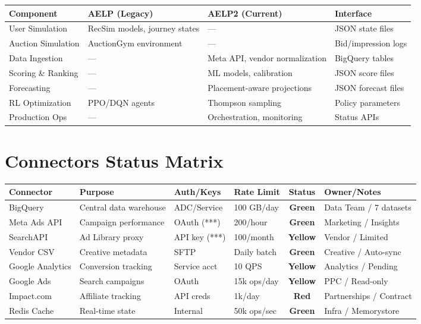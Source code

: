 \documentclass[11pt,a4paper]{report}
\newcommand{\statusgreen}[1]{\textcolor{aelpgreen}{\textbf{#1}}}
\newcommand{\statusyellow}[1]{\textcolor{aelpyellow}{\textbf{#1}}}
\newcommand{\statusred}[1]{\textcolor{aelpred}{\textbf{#1}}}
\begin{document}
\begin{table}[H]
\centering
\begin{tabularx}{\textwidth}{l|X|X|X}
\toprule
\textbf{Component} & \textbf{AELP (Legacy)} & \textbf{AELP2 (Current)} & \textbf{Interface} \\
\midrule
User Simulation & RecSim models, journey states & --- & JSON state files \\
Auction Simulation & AuctionGym environment & --- & Bid/impression logs \\
Data Ingestion & --- & Meta API, vendor normalization & BigQuery tables \\
Scoring \& Ranking & --- & ML models, calibration & JSON score files \\
Forecasting & --- & Placement-aware projections & JSON forecast files \\
RL Optimization & PPO/DQN agents & Thompson sampling & Policy parameters \\
Production Ops & --- & Orchestration, monitoring & Status APIs \\
\bottomrule
\end{tabularx}
\end{table}

\chapter{Connectors Status Matrix}

\begin{table}[H]
\centering
\small
\begin{tabularx}{\textwidth}{l|X|l|l|c|X}
\toprule
\textbf{Connector} & \textbf{Purpose} & \textbf{Auth/Keys} & \textbf{Rate Limit} & \textbf{Status} & \textbf{Owner/Notes} \\
\midrule
BigQuery & Central data warehouse & ADC/Service & 100 GB/day & \statusgreen{Green} & Data Team / 7 datasets \\
Meta Ads API & Campaign performance & OAuth (***) & 200/hour & \statusgreen{Green} & Marketing / Insights \\
SearchAPI & Ad Library proxy & API key (***) & 100/month & \statusyellow{Yellow} & Vendor / Limited \\
Vendor CSV & Creative metadata & SFTP & Daily batch & \statusgreen{Green} & Creative / Auto-sync \\
Google Analytics & Conversion tracking & Service acct & 10 QPS & \statusyellow{Yellow} & Analytics / Pending \\
Google Ads & Search campaigns & OAuth & 15k ops/day & \statusyellow{Yellow} & PPC / Read-only \\
Impact.com & Affiliate tracking & API creds & 1k/day & \statusred{Red} & Partnerships / Contract \\
Redis Cache & Real-time state & Internal & 50k ops/sec & \statusgreen{Green} & Infra / Memorystore \\
\bottomrule
\end{tabularx}
\end{table}
\end{document}
